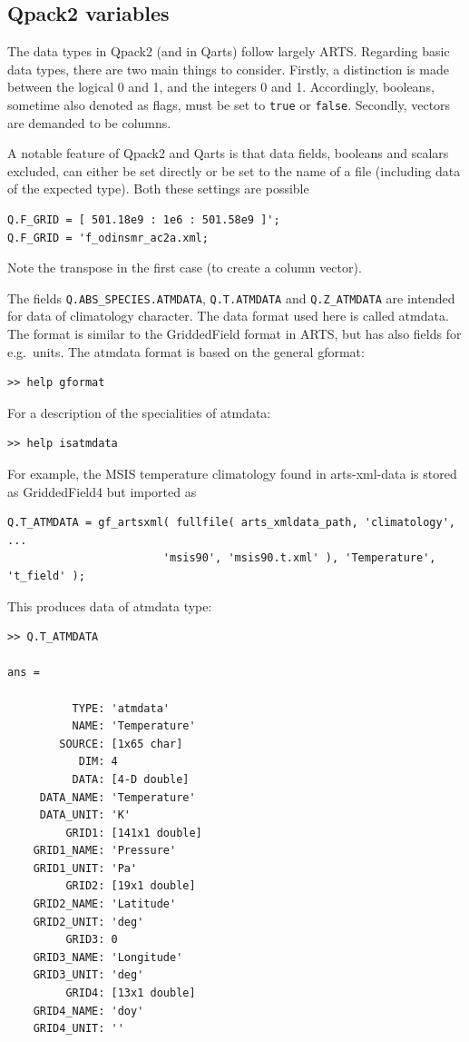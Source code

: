 \documentclass[a4paper,11pt]{article}
\begin{document}
\subsection{Qpack2 variables}
%
The data types in Qpack2 (and in Qarts) follow largely ARTS. Regarding basic
data types, there are two main things to consider. Firstly, a distinction is
made between the logical 0 and 1, and the integers 0 and 1. Accordingly,
booleans, sometime also denoted as flags, must be set to \verb|true| or
\verb|false|. Secondly, vectors are demanded to be columns.

A notable feature of Qpack2 and Qarts is that data fields, booleans and scalars
excluded, can either be set directly or be set to the name of a file (including
data of the expected type). Both these settings are possible
\begin{verbatim}
Q.F_GRID = [ 501.18e9 : 1e6 : 501.58e9 ]';
Q.F_GRID = 'f_odinsmr_ac2a.xml;
\end{verbatim}
Note the transpose in the first case (to create a column vector).

The fields \verb|Q.ABS_SPECIES.ATMDATA|, \verb|Q.T.ATMDATA| and
\verb|Q.Z_ATMDATA| are intended for data of climatology character. The data
format used here is called atmdata. The format is similar to the GriddedField
format in ARTS, but has also fields for e.g.\ units. The atmdata format is
based on the general gformat:
\begin{verbatim}
>> help gformat
\end{verbatim}
For a description of the specialities of atmdata:
\begin{verbatim}
>> help isatmdata
\end{verbatim}
For example, the MSIS temperature climatology found in arts-xml-data is stored
as GriddedField4 but imported as
\begin{verbatim}
Q.T_ATMDATA = gf_artsxml( fullfile( arts_xmldata_path, 'climatology', ...
                        'msis90', 'msis90.t.xml' ), 'Temperature', 't_field' );
\end{verbatim}
This produces data of atmdata type:
\begin{verbatim}
>> Q.T_ATMDATA

ans = 

          TYPE: 'atmdata'
          NAME: 'Temperature'
        SOURCE: [1x65 char]
           DIM: 4
          DATA: [4-D double]
     DATA_NAME: 'Temperature'
     DATA_UNIT: 'K'
         GRID1: [141x1 double]
    GRID1_NAME: 'Pressure'
    GRID1_UNIT: 'Pa'
         GRID2: [19x1 double]
    GRID2_NAME: 'Latitude'
    GRID2_UNIT: 'deg'
         GRID3: 0
    GRID3_NAME: 'Longitude'
    GRID3_UNIT: 'deg'
         GRID4: [13x1 double]
    GRID4_NAME: 'doy'
    GRID4_UNIT: ''
\end{verbatim}
\end{document}
